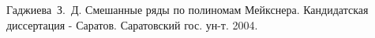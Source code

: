 \begin{thebibliography}{999}
%
%

%
%

%
%

%
%

%
%

%
%




Гаджиева~З.~Д. Смешанные ряды по полиномам Мейкснера. Кандидатская диссертация - Саратов. Саратовский гос. ун-т. 2004.



%
%

%
%

%
%





\end{thebibliography}
